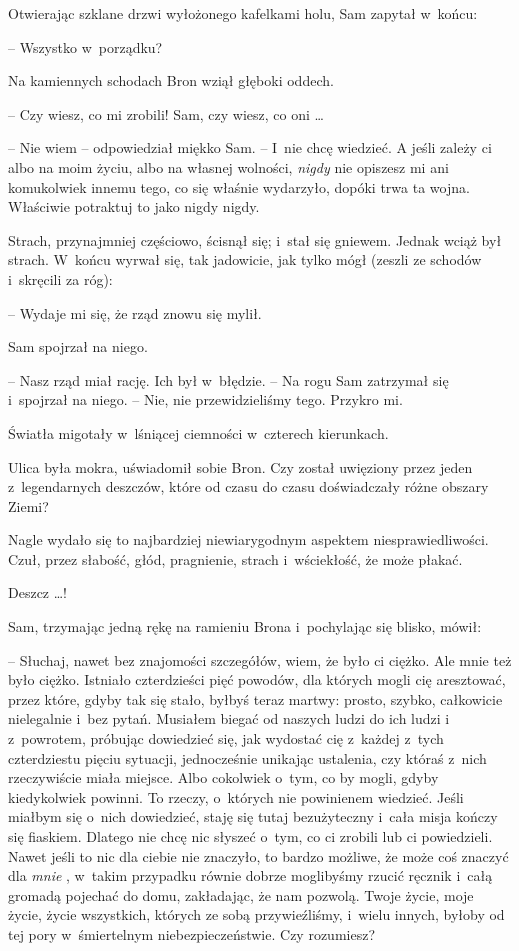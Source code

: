 \documentclass[oneside,polish,11pt,rmheadings]{mwbk}
\begin{document}
Otwierając szklane drzwi wyłożonego kafelkami holu, Sam zapytał w~końcu: 

-- Wszystko w~porządku? 

Na kamiennych schodach Bron wziął głęboki oddech. 

-- Czy wiesz, co mi zrobili! Sam, czy wiesz, co oni \ldots  

-- Nie wiem -- odpowiedział miękko Sam. -- I~nie chcę wiedzieć. A jeśli zależy ci albo na moim życiu, albo na własnej wolności, \textit{nigdy } nie opiszesz mi ani komukolwiek innemu tego, co się właśnie wydarzyło, dopóki trwa ta wojna. Właściwie potraktuj to jako nigdy nigdy. 

Strach, przynajmniej częściowo, ścisnął się; i~stał się gniewem. Jednak wciąż był strach. W~końcu wyrwał się, tak jadowicie, jak tylko mógł (zeszli ze schodów i~skręcili za róg): 

-- Wydaje mi się, że rząd znowu się mylił. 

Sam spojrzał na niego. 

-- Nasz rząd miał rację.  Ich był w~błędzie. --  Na rogu Sam zatrzymał się i~spojrzał na niego. -- Nie, nie przewidzieliśmy tego. Przykro mi.  

Światła migotały w~lśniącej ciemności w~czterech kierunkach. 

Ulica była mokra, uświadomił sobie Bron. Czy został uwięziony przez jeden z~legendarnych deszczów, które od czasu do czasu doświadczały różne obszary Ziemi? 

Nagle wydało się to najbardziej niewiarygodnym aspektem niesprawiedliwości. Czuł, przez słabość, głód, pragnienie, strach i~wściekłość, że może płakać. 

Deszcz  \ldots  ! 

Sam, trzymając jedną rękę na ramieniu Brona i~pochylając się blisko, mówił: 

-- Słuchaj, nawet bez znajomości szczegółów, wiem, że było ci ciężko. Ale mnie też było ciężko. Istniało czterdzieści pięć powodów, dla których mogli cię aresztować, przez które, gdyby tak się stało, byłbyś teraz martwy: prosto, szybko, całkowicie nielegalnie i~bez pytań. Musiałem biegać  od naszych ludzi do ich ludzi i  z~powrotem, próbując dowiedzieć się, jak wydostać cię z~każdej z~tych czterdziestu pięciu sytuacji, jednocześnie unikając ustalenia, czy któraś z~nich rzeczywiście miała miejsce. Albo cokolwiek o~tym, co by mogli, gdyby kiedykolwiek powinni. To rzeczy, o~których nie powinienem wiedzieć. Jeśli miałbym się o~nich dowiedzieć, staję się tutaj bezużyteczny i~cała misja kończy się fiaskiem. Dlatego nie chcę nic słyszeć o~tym, co ci zrobili lub ci powiedzieli. Nawet jeśli to nic dla ciebie nie znaczyło, to bardzo możliwe, że może coś znaczyć dla \textit{mnie }, w~takim przypadku równie dobrze moglibyśmy rzucić ręcznik i~całą gromadą pojechać do domu, zakładając, że nam pozwolą. Twoje życie, moje życie, życie wszystkich, których ze sobą przywieźliśmy, i~wielu innych, byłoby od tej pory w~śmiertelnym niebezpieczeństwie. Czy rozumiesz? 
\end{document}
